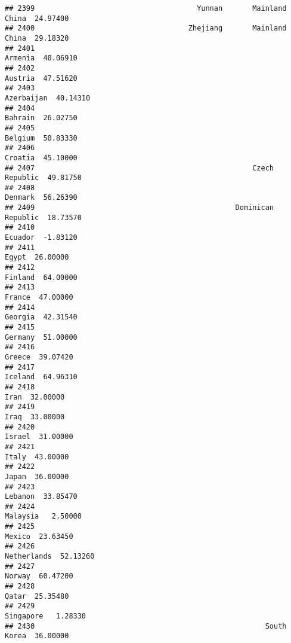 \documentclass[
]{article}
\begin{document}
\begin{verbatim}
## 2399                                      Yunnan       Mainland China  24.97400
## 2400                                    Zhejiang       Mainland China  29.18320
## 2401                                                          Armenia  40.06910
## 2402                                                          Austria  47.51620
## 2403                                                       Azerbaijan  40.14310
## 2404                                                          Bahrain  26.02750
## 2405                                                          Belgium  50.83330
## 2406                                                          Croatia  45.10000
## 2407                                                   Czech Republic  49.81750
## 2408                                                          Denmark  56.26390
## 2409                                               Dominican Republic  18.73570
## 2410                                                          Ecuador  -1.83120
## 2411                                                            Egypt  26.00000
## 2412                                                          Finland  64.00000
## 2413                                                           France  47.00000
## 2414                                                          Georgia  42.31540
## 2415                                                          Germany  51.00000
## 2416                                                           Greece  39.07420
## 2417                                                          Iceland  64.96310
## 2418                                                             Iran  32.00000
## 2419                                                             Iraq  33.00000
## 2420                                                           Israel  31.00000
## 2421                                                            Italy  43.00000
## 2422                                                            Japan  36.00000
## 2423                                                          Lebanon  33.85470
## 2424                                                         Malaysia   2.50000
## 2425                                                           Mexico  23.63450
## 2426                                                      Netherlands  52.13260
## 2427                                                           Norway  60.47200
## 2428                                                            Qatar  25.35480
## 2429                                                        Singapore   1.28330
## 2430                                                      South Korea  36.00000

\end{verbatim}
\end{document}
